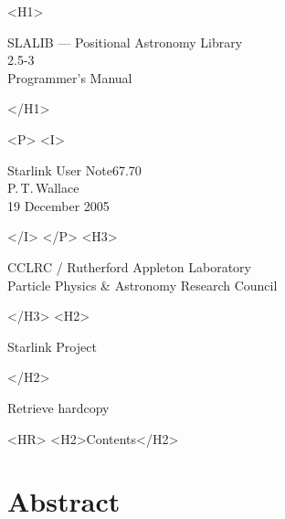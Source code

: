 \documentclass[11pt,twoside]{article}
\newcommand{\stardoccategory}  {Starlink User Note}
\newcommand{\stardocsource}    {sun67.70}
\newcommand{\stardocnumber}    {67.70}
\newcommand{\stardocauthors}   {P.\,T.\,Wallace}
\newcommand{\stardocdate}      {19 December 2005}
\newcommand{\stardoctitle}     {SLALIB --- Positional Astronomy Library}
\newcommand{\stardocversion}   {2.5-3}
\newcommand{\stardocmanual}    {Programmer's Manual}
\newcommand{\htmladdnormallink}[2]{#1}
\newcommand{\htmladdimg}[1]{}
\newcommand{\htmlref}[2]{#1}
\newcommand{\htmladdtonavigation}[1]{}
\newcommand{\xlabel}[1]{}
\newcommand{\latexonlytoc}[0]{\tableofcontents}
\begin{document}
\begin{htmlonly}
   \xlabel{}
   \begin{rawhtml} <H1> \end{rawhtml}
      \stardoctitle\\
      \stardocversion\\
      \stardocmanual
   \begin{rawhtml} </H1> \end{rawhtml}


   \begin{rawhtml} <P> <I> \end{rawhtml}
   \stardoccategory \stardocnumber \\
   \stardocauthors \\
   \stardocdate
   \begin{rawhtml} </I> </P> <H3> \end{rawhtml}
      \htmladdnormallink{CCLRC}{http://www.cclrc.ac.uk} /
      \htmladdnormallink{Rutherford Appleton Laboratory}
                        {http://www.cclrc.ac.uk} \\
      \htmladdnormallink{Particle Physics \& Astronomy Research Council}
                        {http://www.pparc.ac.uk} \\
   \begin{rawhtml} </H3> <H2> \end{rawhtml}
      \htmladdnormallink{Starlink Project}{http://star-www.rl.ac.uk/}
   \begin{rawhtml} </H2> \end{rawhtml}
   \htmladdnormallink{\htmladdimg{source.gif} Retrieve hardcopy}
      {http://star-www.rl.ac.uk/cgi-bin/hcserver?\stardocsource}\\

  \label{stardoccontents}
  \begin{rawhtml}
    <HR>
    <H2>Contents</H2>
  \end{rawhtml}
  \renewcommand{\latexonlytoc}[0]{}
  \htmladdtonavigation{\htmlref{\htmladdimg{contents_motif.gif}}
        {stardoccontents}}

  \section{\xlabel{abstract}Abstract}
\end{htmlonly}
\end{document}
